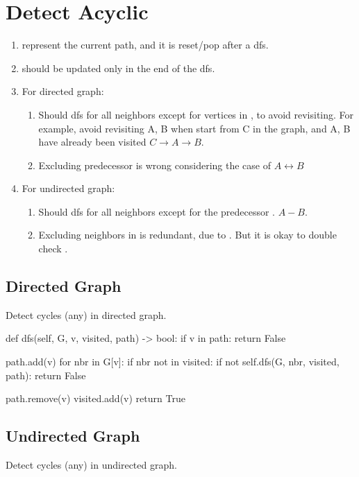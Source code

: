 \section{Detect Acyclic}
\begin{enumerate}
\item {} represent the current path, and it is reset/pop after a dfs.
\item {} should be updated only in the end of the dfs.
\item For directed graph:
\begin{enumerate}
\item Should dfs for all neighbors except for vertices in , to avoid revisiting. For example, avoid revisiting A, B when start from C in the graph, and A, B have already been visited $C \rightarrow A \rightarrow B$.
\item Excluding predecessor  is wrong considering the case of $A \leftrightarrow B$
\end{enumerate}
\item For undirected graph:
\begin{enumerate}
\item Should dfs for all neighbors except for the predecessor . $A-B$.
\item Excluding neighbors in  is redundant, due to . But it is okay to double check .
\end{enumerate}
\end{enumerate}

\subsection{Directed Graph}
Detect cycles (any) in directed graph.

\begin{python}
def dfs(self, G, v, visited, path) -> bool:
  if v in path:
    return False

  path.add(v)
  for nbr in G[v]:
    if nbr not in visited:
      if not self.dfs(G, nbr, visited, path):
        return False

  path.remove(v)
  visited.add(v)
  return True
\end{python}


\subsection{Undirected Graph}
Detect cycles (any) in undirected graph.

